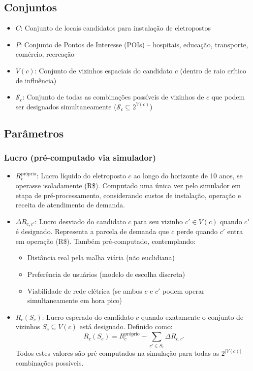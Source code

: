 \subsection{Conjuntos}

\begin{itemize}
    \item $C$: Conjunto de locais candidatos para instalação de eletropostos
    \item $P$: Conjunto de Pontos de Interesse (POIs) -- hospitais, educação, transporte, comércio, recreação
    \item $V(c)$: Conjunto de vizinhos espaciais do candidato $c$ (dentro de raio crítico de influência)
    \item $\mathcal{S}_c$: Conjunto de todas as combinações possíveis de vizinhos de $c$ que podem ser designados simultaneamente ($\mathcal{S}_c \subseteq 2^{V(c)}$)
\end{itemize}

\subsection{Parâmetros}

\subsubsection{Lucro (pré-computado via simulador)}

\begin{itemize}
    \item $R_c^{\text{próprio}}$: Lucro líquido do eletroposto $c$ ao longo do horizonte de 10 anos, se operasse isoladamente (R\$). Computado uma única vez pelo simulador em etapa de pré-processamento, considerando custos de instalação, operação e receita de atendimento de demanda.
    
    \item $\Delta R_{c,c'}$: Lucro desviado do candidato $c$ para seu vizinho $c' \in V(c)$ quando $c'$ é designado. Representa a parcela de demanda que $c$ perde quando $c'$ entra em operação (R\$). Também pré-computado, contemplando:
    \begin{itemize}
        \item Distância real pela malha viária (não euclidiana)
        \item Preferência de usuários (modelo de escolha discreta)
        \item Viabilidade de rede elétrica (se ambos $c$ e $c'$ podem operar simultaneamente em hora pico)
    \end{itemize}
    
    \item $R_c(S_c)$: Lucro esperado do candidato $c$ quando exatamente o conjunto de vizinhos $S_c \subseteq V(c)$ está designado. Definido como:
    \begin{equation}
    R_c(S_c) = R_c^{\text{próprio}} - \sum_{c' \in S_c} \Delta R_{c,c'}
    \end{equation}
    Todos estes valores são pré-computados na simulação para todas as $2^{|V(c)|}$ combinações possíveis.
\end{itemize}


